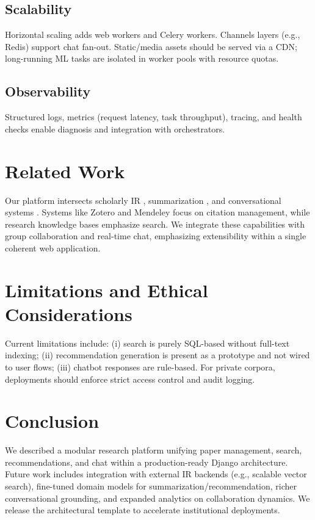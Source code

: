 \documentclass[conference]{IEEEtran}
\begin{document}
\subsection{Scalability}
Horizontal scaling adds web workers and Celery workers. Channels layers (e.g., Redis) support chat fan-out. Static/media assets should be served via a CDN; long-running ML tasks are isolated in worker pools with resource quotas.

\subsection{Observability}
Structured logs, metrics (request latency, task throughput), tracing, and health checks enable diagnosis and integration with orchestrators.

\section{Related Work}
Our platform intersects scholarly IR \cite{manning2008ir}, summarization \cite{lewis2019bart}, and conversational systems \cite{roller2021recipes}. Systems like Zotero and Mendeley focus on citation management, while research knowledge bases emphasize search. We integrate these capabilities with group collaboration and real-time chat, emphasizing extensibility within a single coherent web application.

\section{Limitations and Ethical Considerations}
Current limitations include: (i) search is purely SQL-based without full-text indexing; (ii) recommendation generation is present as a prototype and not wired to user flows; (iii) chatbot responses are rule-based. For private corpora, deployments should enforce strict access control and audit logging.

\section{Conclusion}
We described a modular research platform unifying paper management, search, recommendations, and chat within a production-ready Django architecture. Future work includes integration with external IR backends (e.g., scalable vector search), fine-tuned domain models for summarization/recommendation, richer conversational grounding, and expanded analytics on collaboration dynamics. We release the architectural template to accelerate institutional deployments.
\end{document}
